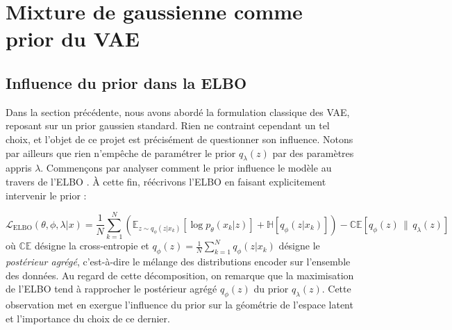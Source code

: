 \documentclass{article}
\begin{document}
    \section{Mixture de gaussienne comme prior du VAE}
    \label{sec:gmm_prior}
        \subsection{Influence du prior dans la ELBO}
            Dans la section précédente, nous avons abordé la formulation classique des VAE, reposant sur un prior gaussien standard. Rien ne contraint cependant un tel choix, et l'objet de ce projet est précisément de questionner son influence. Notons par ailleurs que rien n'empêche de paramétrer le prior $q_\lambda(z)$ par des paramètres appris $\lambda$. Commençons par analyser comment le prior influence le modèle au travers de l'ELBO \cite{tomczak2022priors}. À cette fin, réécrivons l'ELBO en faisant explicitement intervenir le prior :

            \begin{equation}
                \label{eq:ELBO_prior}
                \mathcal{L}_{\mathrm{ELBO}}(\theta, \phi, \lambda | x) 
                = \frac{1}{N}\sum_{k=1}^N \left(\mathbb{E}_{z \sim q_\phi(z|x_k)}\left[\log p_\theta(x_k|z)\right] + \mathbb{H}\left[q_\phi(z|x_k)\right]\right)
                - \mathbb{CE}\left[q_\phi(z) \,\Big\|\, q_\lambda(z)\right]
            \end{equation}
            où $\mathbb{CE}$ désigne la cross-entropie et $q_\phi(z) = \frac{1}{N} \sum_{k=1}^N q_\phi(z|x_k)$ désigne le \textit{postérieur agrégé}, c'est-à-dire le mélange des distributions encoder sur l'ensemble des données. Au regard de cette décomposition, on remarque que la maximisation de l'ELBO tend à rapprocher le postérieur agrégé $q_\phi(z)$ du prior $q_\lambda(z)$. Cette observation met en exergue l'influence du prior sur la géométrie de l'espace latent et l'importance du choix de ce dernier.
\end{document}
